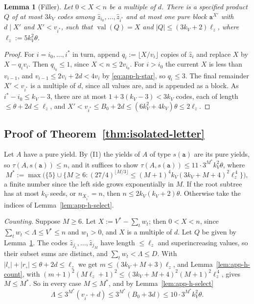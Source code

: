 \documentclass[11pt]{article}
\numberwithin{equation}{section}
\theoremstyle{plain}
\newtheorem{lemma}[theorem]{Lemma}
\theoremstyle{definition}
\theoremstyle{remark}
\theoremstyle{plain}
\begin{document}
\begin{lemma}[Filler]
\label{lem:app-h-filler}
Let $0<X<n$ be a multiple of $d$.  There is a specified product $Q$ of at most
$3k_V$ codes among $\hat z_{i_0},\ldots,\hat z_{i^*}$ and at most one pure block
$\mathtt a^{X'}$ with $d\mid X'$ and $X'<v_{i^*}$, such that
$\operatorname{val}(Q)=X$ and $|Q|\le(3k_V+2)\ell_z$, where
$\ell_z:=5k_V^2\theta$.
\end{lemma}

\begin{proof}
For $i=i_0,\ldots,i^*$ in turn, append $q_i:=\lfloor X/v_i\rfloor$ copies of
$\hat z_i$ and replace $X$ by $X-q_iv_i$.  Then $q_{i_0}\le1$, since
$X<n\le2v_{i_0}$.  For $i>i_0$ the current $X$ is less than $v_{i-1}$, and
$v_{i-1}\le2v_i+2d<4v_i$ by \eqref{eq:app-h-star}, so $q_i\le3$.  The final
remainder $X'<v_{i^*}$ is a multiple of $d$, since all values are, and is
appended as a block.  As $i^*-i_0\le k_V-3$, there are at most
$1+3(k_V-3)<3k_V$ codes, each of length $\le\theta+2d\le\ell_z$, and
$X'<v_{i^*}\le B_0+2d\le(6k_V^2+4k_V)\theta\le2\ell_z$.
\end{proof}

\subsection{Proof of Theorem~\ref{thm:isolated-letter}}

Let $A$ have a pure yield.  By (I1) the yields of $A$ of type $s(\mathtt a)$
are its pure yields, so $\tau(A,s(\mathtt a))\le n$, and it suffices to show
$\tau(A,s(\mathtt a))\le11\cdot3^{M^*}k_V^2\theta$, where
\[
 M^*:=\max\bigl(\{5\}\cup\{M\ge6:(27/4)^{\lfloor M/3\rfloor}
 \le(M+1)^4k_V(3k_V+M+4)^2\ell_z^{\,4}\}\bigr),
\]
a finite number since the left side grows exponentially in $M$.  If the root
subtree has at most $k_V$ seeds, or $n_{X_{i^*}}=n$, then $n\le2k_V(k_V+2)\theta$.
Otherwise take the indices of Lemma~\ref{lem:app-h-select}.

\emph{Counting.}  Suppose $M\ge6$.  Let $X:=V^*-\sum_tw_t$; then $0<X<n$, since
$\sum_tw_t<\Lambda\le V^*\le n$ and $w_1>0$, and $X$ is a multiple of $d$.  Let
$Q$ be given by Lemma~\ref{lem:app-h-filler}.  The codes $\hat z_{j_1},\ldots,\hat
z_{j_M}$ have length $\le\ell_z$ and superincreasing values, so their subset
sums are distinct, and $\sum_tw_t<\Lambda\le D$.  With
$|l_\circ|+|r_\circ|\le\theta+2d\le\ell_z$ we get
$m\le(3k_V+M+3)\ell_z$, and Lemma~\ref{lem:app-h-count}, with
$(m+1)^2(M\ell_z+1)^2\le(3k_V+M+4)^2(M+1)^2\ell_z^{\,4}$, gives $M\le M^*$.  So in
every case $M\le M^*$, and by Lemma~\ref{lem:app-h-select}
\[
 \Lambda\le3^{M^*}(v_{i^*}+d)\le3^{M^*}(B_0+3d)\le10\cdot3^{M^*}k_V^2\theta .
\]
\end{document}
